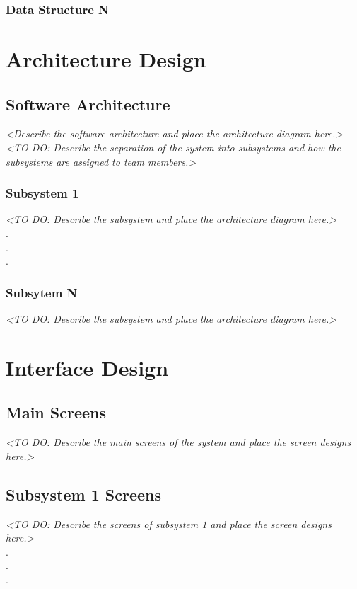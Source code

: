 \documentclass[12pt,a4paper]{report}
\begin{document}
\subsection{Data Structure N}

\chapter{Architecture Design}
\section{Software Architecture}
\textit{<Describe the software architecture and place the architecture diagram here.>}\\
\textit{<TO DO: Describe the separation of the system into subsystems and how the subsystems are
assigned to team members.>}

\subsection{Subsystem 1}
\textit{<TO DO: Describe the subsystem and place the architecture diagram here.>}\\
\hspace*{3cm} . \\
\hspace*{3cm} . \\
\hspace*{3cm} . 
\subsection{Subsytem N}
\textit{<TO DO: Describe the subsystem and place the architecture diagram here.>}\\

\chapter{Interface Design}
\section{Main Screens}
\textit{<TO DO: Describe the main screens of the system and place the screen designs here.>}

\section{Subsystem 1 Screens}
\textit{<TO DO: Describe the screens of subsystem 1 and place the screen designs here.>}\\
\hspace*{3cm} . \\
\hspace*{3cm} . \\
\hspace*{3cm} . 
\end{document}
